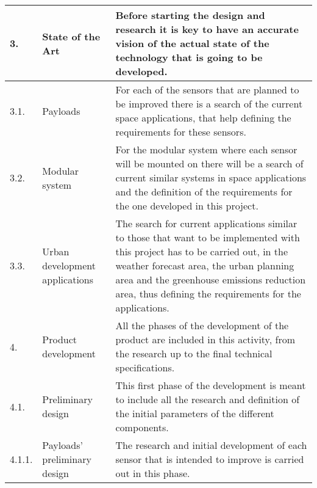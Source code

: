 \begin{longtable}[H]{p{1.5cm} >{\raggedright\arraybackslash}p{4cm} p{8cm}}
	\midrule
	3. & State of the Art & Before starting the design and research it is key to have an accurate vision of the actual state of the technology that is going to be developed.\vspace{0.2cm} \\
	
	\midrule
	
	3.1. & Payloads & For each of the sensors that are planned to be improved there is a search of the current space applications, that help defining the requirements for these sensors.\vspace{0.2cm} \\
	
	\midrule
	
	3.2. & Modular system & For the modular system where each sensor will be mounted on there will be a search of current similar systems in space applications and the definition of the requirements for the one developed in this project.\vspace{0.2cm} \\
	
	\midrule
	
	3.3. & Urban development applications & The search for current applications similar to those that want to be implemented with this project has to be carried out, in the weather forecast area, the urban planning area and the greenhouse emissions reduction area, thus defining the requirements for the applications.\vspace{0.2cm} \\
	
	\midrule
	
	4. & Product development & All the phases of the development of the product are included in this activity, from the research up to the final technical specifications.\vspace{0.2cm} \\
	
	\midrule
	
	4.1. & Preliminary design & This first phase of the development is meant to include all the research and definition of the initial parameters of the different components.\vspace{0.2cm} \\
	
	\midrule
	
	4.1.1. & Payloads' preliminary design & The research and initial development of each sensor that is intended to improve is carried out in this phase.\vspace{0.2cm} \\
	

\end{longtable}
